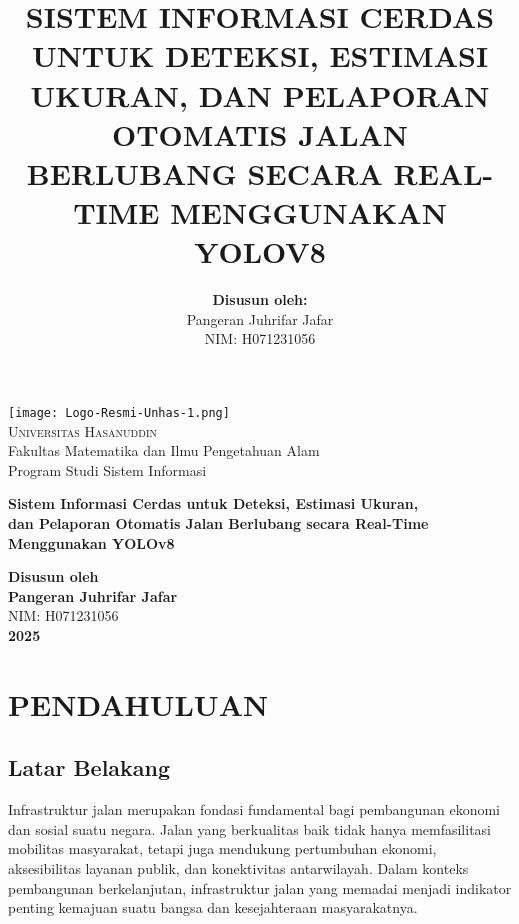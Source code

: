 \documentclass[12pt,a4paper]{report}
\title{
    \textbf{SISTEM INFORMASI CERDAS UNTUK DETEKSI, ESTIMASI UKURAN, DAN PELAPORAN OTOMATIS JALAN BERLUBANG SECARA REAL-TIME MENGGUNAKAN YOLOV8}
}
\author{
    \textbf{Disusun oleh:}\\
    Pangeran Juhrifar Jafar\\
    NIM: H071231056
}
\date{}
\begin{document}
\begin{titlepage}
    \centering
    \vspace*{1cm}
    
    \texttt{[image: Logo-Resmi-Unhas-1.png]}\\[1cm]
    
    {\large \textsc{Universitas Hasanuddin}}\\[0.2cm]
    {\normalsize Fakultas Matematika dan Ilmu Pengetahuan Alam}\\[0.2cm]
    {\normalsize Program Studi Sistem Informasi}\\[2cm]
    
    {\LARGE \bfseries
    Sistem Informasi Cerdas untuk Deteksi, Estimasi Ukuran,\\
    dan Pelaporan Otomatis Jalan Berlubang secara Real-Time\\
    Menggunakan YOLOv8
    \par}
    
    \vspace{2.5cm}
    
    {\large \textbf{Disusun oleh}}\\[0.5cm]
    {\Large \textbf{Pangeran Juhrifar Jafar}}\\[0.3cm]
    {\normalsize NIM: H071231056}\\[3cm]
    
    {\large \textbf{2025}}
\end{titlepage}






\tableofcontents
\newpage

\chapter{PENDAHULUAN}

\section{Latar Belakang}

Infrastruktur jalan merupakan fondasi fundamental bagi pembangunan ekonomi dan sosial suatu negara. Jalan yang berkualitas baik tidak hanya memfasilitasi mobilitas masyarakat, tetapi juga mendukung pertumbuhan ekonomi, aksesibilitas layanan publik, dan konektivitas antarwilayah. Dalam konteks pembangunan berkelanjutan, infrastruktur jalan yang memadai menjadi indikator penting kemajuan suatu bangsa dan kesejahteraan masyarakatnya.
\end{document}
